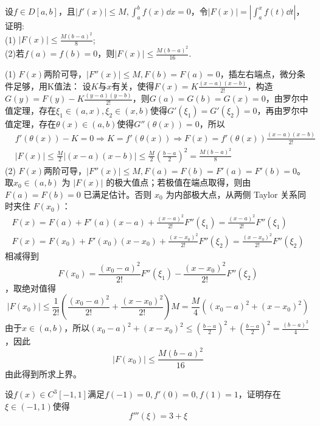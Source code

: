 \newpage
\begin{example}
    设$f\in D[a,b]$，且$|f'(x)|\leqslant M,\displaystyle \int_a^bf(x)\dd x=0$，令$\displaystyle |F(x)|=\left|\int_a^xf(t)\dd t\right|$，证明:\\
    (1) $\displaystyle |F(x)|\leqslant \frac{M(b-a)^2}{8}$;\\
    (2)若$f(a)=f(b)=0$，则$\displaystyle |F(x)|\leqslant \frac{M(b-a)^2}{16}$.
\end{example}
\begin{solution}
(1) $F(x)$两阶可导，$|F''(x)|\leqslant M,F(b)=F(a)=0$，插左右端点，微分条件足够，用K值法：
设$K$与$x$有关，使得$F(x)=K\frac{(x-a)(x-b)}{2!}$，构造$G(y)=F(y)-K\frac{(y-a)(y-b)}{2!}$，则$G(a)=G(b)=G(x)=0$，由罗尔中值定理，存在$\xi_1\in(a,x),\xi_2\in(x,b)$使得$G'(\xi_1)=G'(\xi_2)=0$，再由罗尔中值定理，存在$\theta(x)\in(a,b)$使得$G''(\theta(x))=0$，所以
\begin{align*}
    &f'(\theta(x))-K=0\Rightarrow K=f'(\theta(x))\Rightarrow F(x)=f'(\theta(x))\frac{(x-a)(x-b)}{2!}\\
    &|F(x)|\leqslant \frac{M}{2}|(x-a)(x-b)|\leqslant \frac{M}{2}\left(\frac{b-a}{2}\right)^2=\frac{M(b-a)^2}{8}
\end{align*}
(2) $F(x)$两阶可导，$|F''(x)|\leqslant M,F(a)=F(b)=F'(a)=F'(b)=0$。取$x_0\in(a,b)$ 为 $|F(x)|$ 的极大值点；若极值在端点取得，则由 $F(a)=F(b)=0$ 已满足估计。否则 $x_0$ 为内部极大点，从两侧 Taylor 关系同时夹住 $F(x_0)$：
\begin{align*}
    F(x)=F(a)+F'(a)(x-a)+\frac{(x-a)^2}{2!}F''(\xi_1)=\frac{(x-a)^2}{2!}F''(\xi_1)\\
    F(x)=F(x_0)+F'(x_0)(x-x_0)+\frac{(x-x_0)^2}{2!}F''(\xi_2)=\frac{(x-x_0)^2}{2!}F''(\xi_2)
\end{align*}
相减得到\[F(x_0)=\frac{(x_0-a)^2}{2!}F''(\xi_1)-\frac{(x-x_0)^2}{2!}F''(\xi_2)\]，取绝对值得
\[|F(x_0)|\leqslant \frac{1}{2!}\left(\frac{(x_0-a)^2}{2!}+\frac{(x-x_0)^2}{2!}\right)M=\frac{M}{4}\left((x_0-a)^2+(x-x_0)^2\right)\]
由于$x\in(a,b)$，所以$(x_0-a)^2+(x-x_0)^2\leqslant \left(\frac{b-a}{2}\right)^2+\left(\frac{b-a}{2}\right)^2=\frac{(b-a)^2}{4}$，因此\[|F(x_0)|\leqslant \frac{M(b-a)^2}{16}\]
由此得到所求上界。
\end{solution}
\newpage
\begin{example}[$f'''(\xi)=3+\xi$]
    设$f(x)\in C^3[-1,1]$满足$f(-1)=0,f'(0)=0,f(1)=1$，证明存在$\xi\in(-1,1)$使得\[f'''(\xi)=3+\xi\]
\end{example}
